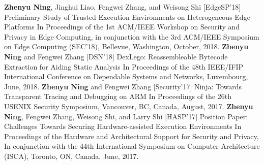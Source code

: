 \begin{cventries}
  \cventry
    {\textbf{Zhenyu Ning}, Jinghui Liao, Fengwei Zhang, and Weisong Shi} %
    {[EdgeSP'18] Preliminary Study of Trusted Execution Environments on Heterogeneous Edge Platforms} %
    {} %
    {} %
    {In Proceedings of the 1st ACM/IEEE Workshop on Security and Privacy in Edge Computing, in conjunction with the 3rd ACM/IEEE Symposium on Edge Computing (SEC'18), Bellevue, Washington, October, 2018.
    }
    \vspace{10pt}
  \cventry
    {\textbf{Zhenyu Ning} and Fengwei Zhang} %
    {[DSN'18] DexLego: Reassembleable Bytecode Extraction for Aiding Static Analysis} %
    {} %
    {} %
    {In Proceedings of the 48th IEEE/IFIP International Conference on Dependable Systems and Networks, Luxembourg, June, 2018.}
    \vspace{10pt}
  \cventry
    {\textbf{Zhenyu Ning} and Fengwei Zhang} %
    {[Security'17] Ninja: Towards Transparent Tracing and Debugging on ARM} %
    {} %
    {} %
    {In Proceedings of the 26th USENIX Security Symposium, Vancouver, BC, Canada, August, 2017.}
    \vspace{10pt}
  \cventry
    {\textbf{Zhenyu Ning}, Fengwei Zhang, Weisong Shi, and Larry Shi} %
    {[HASP'17] Position Paper: Challenges Towards Securing Hardware-assisted Execution Environments} %
    {} %
    {} %
    {In Proceedings of the Hardware and Architectural Support for Security and Privacy, In conjunction with the 44th International Symposium on Computer Architecture (ISCA), Toronto, ON, Canada, June, 2017.}
    \vspace{10pt}
\end{cventries}
